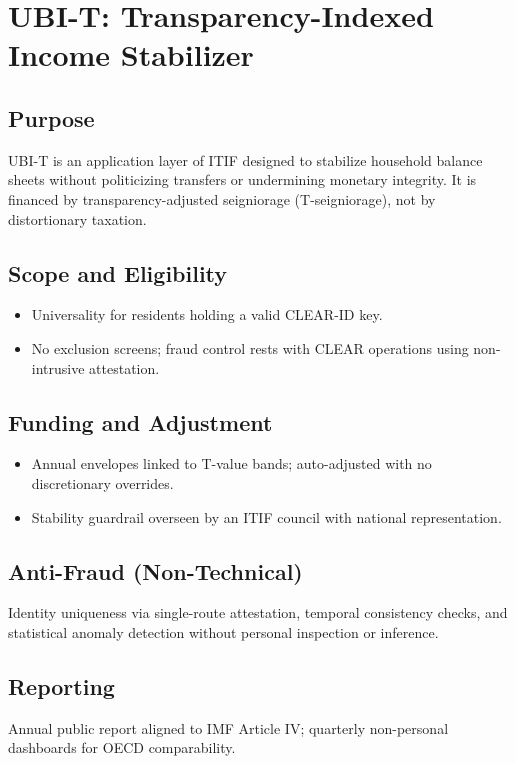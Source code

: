 \section{UBI-T: Transparency-Indexed Income Stabilizer}
\subsection{Purpose}
UBI-T is an application layer of ITIF designed to stabilize household balance sheets without politicizing transfers or undermining monetary integrity. It is financed by transparency-adjusted seigniorage (T-seigniorage), not by distortionary taxation.

\subsection{Scope and Eligibility}
\begin{itemize}
  \item Universality for residents holding a valid CLEAR-ID key.
  \item No exclusion screens; fraud control rests with CLEAR operations using non-intrusive attestation.
\end{itemize}

\subsection{Funding and Adjustment}
\begin{itemize}
  \item Annual envelopes linked to T-value bands; auto-adjusted with no discretionary overrides.
  \item Stability guardrail overseen by an ITIF council with national representation.
\end{itemize}

\subsection{Anti-Fraud (Non-Technical)}
Identity uniqueness via single-route attestation, temporal consistency checks, and statistical anomaly detection without personal inspection or inference.

\subsection{Reporting}
Annual public report aligned to IMF Article IV; quarterly non-personal dashboards for OECD comparability.

